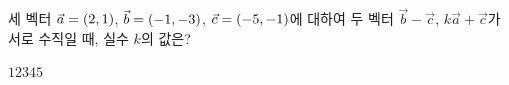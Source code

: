 세 벡터 $\vec{a}=(2{,}\mkern3mu\mathopen{}1)$, $\vec{b}=(-1{,}\mkern3mu\mathopen{}-3)$, $\vec{c}=(-5{,}\mkern3mu\mathopen{}-1)$에 대하여 두 벡터 $\vec{b}-\vec{c}$, $k\vec{a}+\vec{c}$가 서로 수직일 때, 실수 $k$의 값은?
\begin{choices32}{$1$}{$2$}{$3$}{$4$}{$5$}\end{choices32}
